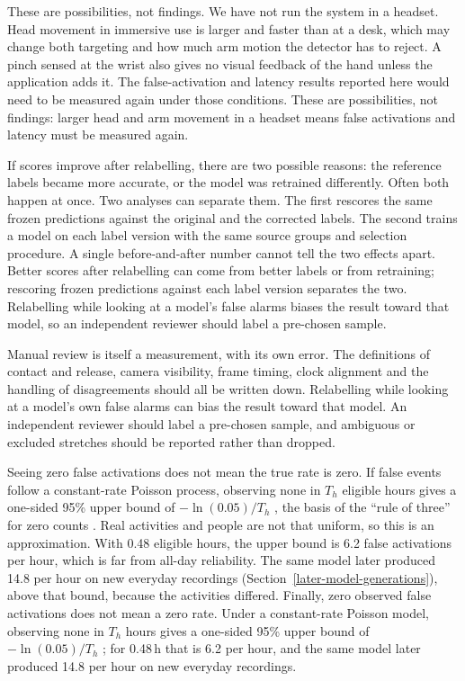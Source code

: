 \iffull
These are possibilities, not findings. We have not run the system in a headset. Head movement in immersive use is larger and faster than at a desk, which may change both targeting and how much arm motion the detector has to reject. A pinch sensed at the wrist also gives no visual feedback of the hand unless the application adds it. The false-activation and latency results reported here would need to be measured again under those conditions.
\else
These are possibilities, not findings: larger head and arm movement in a headset means false activations and latency must be measured again.
\fi

\iffull
{}\label{annotation-changes-versus-learning-improvements}
\fi

\iffull
If scores improve after relabelling, there are two possible reasons: the reference labels became more accurate, or the model was retrained differently. Often both happen at once. Two analyses can separate them. The first rescores the same frozen predictions against the original and the corrected labels. The second trains a model on each label version with the same source groups and selection procedure. A single before-and-after number cannot tell the two effects apart.
\else
Better scores after relabelling can come from better labels or from retraining; rescoring frozen predictions against each label version separates the two. Relabelling while looking at a model's false alarms biases the result toward that model, so an independent reviewer should label a pre-chosen sample.
\fi

\iffull
Manual review is itself a measurement, with its own error. The definitions of contact and release, camera visibility, frame timing, clock alignment and the handling of disagreements should all be written down. Relabelling while looking at a model's own false alarms can bias the result toward that model. An independent reviewer should label a pre-chosen sample, and ambiguous or excluded stretches should be reported rather than dropped.
\fi

\iffull
{}\label{why-zero-observed-events-is-not-all-day-reliability}
\fi

\iffull
Seeing zero false activations does not mean the true rate is zero. If false events follow a constant-rate Poisson process, observing none in \(T_h\) eligible hours gives a one-sided 95\% upper bound of \(-\ln(0.05)/T_h\) \cite{garwood1936poisson}, the basis of the ``rule of three'' for zero counts \cite{hanley1983zero}. Real activities and people are not that uniform, so this is an approximation. With 0.48 eligible hours, the upper bound is 6.2 false activations per hour, which is far from all-day reliability. The same model later produced 14.8 per hour on new everyday recordings (Section~\ref{later-model-generations}), above that bound, because the activities differed.
\else
Finally, zero observed false activations does not mean a zero rate. Under a constant-rate Poisson model, observing none in \(T_h\) hours gives a one-sided 95\% upper bound of \(-\ln(0.05)/T_h\) \cite{garwood1936poisson,hanley1983zero}; for 0.48\,h that is 6.2 per hour, and the same model later produced 14.8 per hour on new everyday recordings.
\fi

